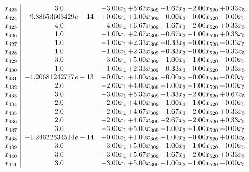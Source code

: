 \documentclass[8pt]{article}
\begin{document}
\[\begin{array}{c| c c@{\hskip 2pt} c@{\hskip 2pt} c@{\hskip 2pt} c@{\hskip 2pt} c@{\hskip 2pt} }
 x_{423}   &  3.0 & -3.00 x_{1} & +  5.67 x_{309} & +  1.67 x_{3} & -2.00 x_{520} & +  0.33 x_{5}\\
 x_{424}   &  -9.88653603429e-14 & +  0.00 x_{1} & +  1.00 x_{309} & +  0.00 x_{3} & -0.00 x_{520} & -0.00 x_{5}\\
 x_{425}   &  4.0 & -4.00 x_{1} & +  6.67 x_{309} & +  1.67 x_{3} & -2.00 x_{520} & +  0.33 x_{5}\\
 x_{426}   &  1.0 & -1.00 x_{1} & +  2.67 x_{309} & +  0.67 x_{3} & -1.00 x_{520} & +  0.33 x_{5}\\
 x_{427}   &  1.0 & -1.00 x_{1} & +  2.33 x_{309} & +  0.33 x_{3} & -0.00 x_{520} & -0.33 x_{5}\\
 x_{428}   &  1.0 & -1.00 x_{1} & +  2.33 x_{309} & +  0.33 x_{3} & -0.00 x_{520} & -0.33 x_{5}\\
 x_{429}   &  3.0 & -3.00 x_{1} & +  5.00 x_{309} & +  1.00 x_{3} & -1.00 x_{520} & -0.00 x_{5}\\
 x_{430}   &  1.0 & -1.00 x_{1} & +  2.33 x_{309} & +  0.33 x_{3} & -0.00 x_{520} & -0.33 x_{5}\\
 x_{431}   &  -1.20681242777e-13 & +  0.00 x_{1} & +  1.00 x_{309} & +  0.00 x_{3} & -0.00 x_{520} & -0.00 x_{5}\\
 x_{432}   &  2.0 & -2.00 x_{1} & +  4.00 x_{309} & +  1.00 x_{3} & -1.00 x_{520} & -0.00 x_{5}\\
 x_{433}   &  3.0 & -3.00 x_{1} & +  5.33 x_{309} & +  1.33 x_{3} & -2.00 x_{520} & +  0.67 x_{5}\\
 x_{434}   &  2.0 & -2.00 x_{1} & +  4.00 x_{309} & +  1.00 x_{3} & -1.00 x_{520} & -0.00 x_{5}\\
 x_{435}   &  2.0 & -2.00 x_{1} & +  4.67 x_{309} & +  1.67 x_{3} & -2.00 x_{520} & +  0.33 x_{5}\\
 x_{436}   &  2.0 & -2.00 x_{1} & +  4.67 x_{309} & +  2.67 x_{3} & -2.00 x_{520} & +  0.33 x_{5}\\
 x_{437}   &  3.0 & -3.00 x_{1} & +  5.00 x_{309} & +  1.00 x_{3} & -1.00 x_{520} & -0.00 x_{5}\\
 x_{438}   &  -1.24622534514e-14 & +  0.00 x_{1} & +  1.00 x_{309} & +  1.00 x_{3} & -0.00 x_{520} & +  0.00 x_{5}\\
 x_{439}   &  3.0 & -3.00 x_{1} & +  5.00 x_{309} & +  1.00 x_{3} & -1.00 x_{520} & -0.00 x_{5}\\
 x_{440}   &  3.0 & -3.00 x_{1} & +  5.67 x_{309} & +  1.67 x_{3} & -2.00 x_{520} & +  0.33 x_{5}\\
 x_{441}   &  3.0 & -3.00 x_{1} & +  5.00 x_{309} & +  1.00 x_{3} & -1.00 x_{520} & -0.00 x_{5}\\

\end{array}\]
\end{document}
